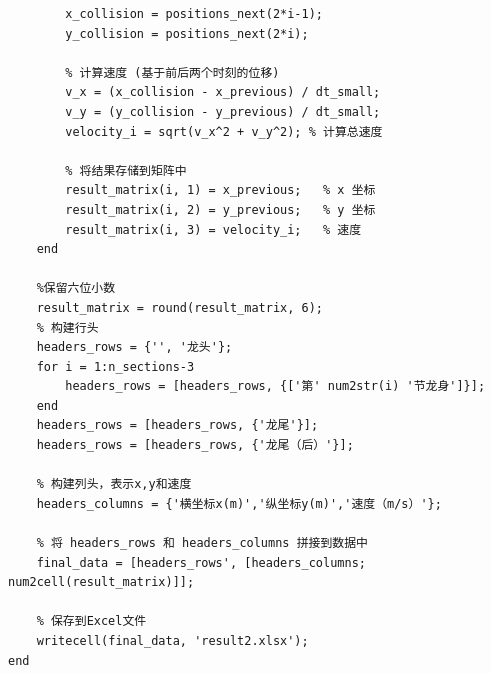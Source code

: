 \documentclass{cumcmthesis1}
\begin{document}
\begin{lstlisting}[caption={求解问题2的代码，将碰撞时间打印到控制台，并将位置，速度等信息写入到result2.xlsx中}, label={lst:second_code}]
        % 获取碰撞时刻的 x 和 y 坐标
        x_collision = positions_next(2*i-1);
        y_collision = positions_next(2*i);
        
        % 计算速度 (基于前后两个时刻的位移)
        v_x = (x_collision - x_previous) / dt_small;
        v_y = (y_collision - y_previous) / dt_small;
        velocity_i = sqrt(v_x^2 + v_y^2); % 计算总速度
        
        % 将结果存储到矩阵中
        result_matrix(i, 1) = x_previous;   % x 坐标
        result_matrix(i, 2) = y_previous;   % y 坐标
        result_matrix(i, 3) = velocity_i;   % 速度
    end

    %保留六位小数
    result_matrix = round(result_matrix, 6);
    % 构建行头
    headers_rows = {'', '龙头'};
    for i = 1:n_sections-3
        headers_rows = [headers_rows, {['第' num2str(i) '节龙身']}];
    end
    headers_rows = [headers_rows, {'龙尾'}];
    headers_rows = [headers_rows, {'龙尾（后）'}];

    % 构建列头，表示x,y和速度
    headers_columns = {'横坐标x(m)','纵坐标y(m)','速度（m/s）'};

    % 将 headers_rows 和 headers_columns 拼接到数据中
    final_data = [headers_rows', [headers_columns; num2cell(result_matrix)]];

    % 保存到Excel文件
    writecell(final_data, 'result2.xlsx');
end

\end{lstlisting}
\end{document}

